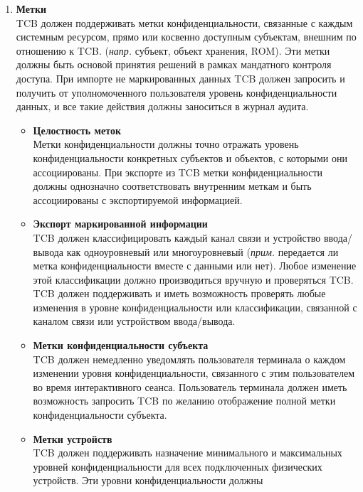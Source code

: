 \begin{enumerate}
\begin{enumerate}
\begin{enumerate}
\begin{enumerate}
                другому субъекту, получившему доступ к объекту хранения, ранее возвращенный системе.
                \item{\textbf{Метки}}\\
                TCB должен поддерживать метки конфиденциальности, связанные с каждым системным ресурсом, прямо или косвенно доступным субъектам, внешним по отношению к TCB. (\textit{напр.} субъект,
                объект хранения, ROM). Эти метки должны быть основой принятия решений в рамках мандатного контроля доступа. При импорте не маркированных данных TCB должен запросить и получить от
                уполномоченного пользователя уровень конфиденциальности данных, и все такие действия должны заноситься в журнал аудита.
                \begin{itemize}
                    \item{\textbf{Целостность меток}}\\
                    Метки конфиденциальности должны точно отражать уровень конфиденциальности конкретных субъектов и объектов, с которыми они ассоциированы. При экспорте из TCB метки конфиденциальности
                    должны однозначно соответствовать внутренним меткам и быть ассоциированы с экспортируемой информацией.
                    \item{\textbf{Экспорт маркированной информации}}\\
                    TCB должен классифицировать каждый канал связи и устройство ввода/вывода как одноуровневый или многоуровневый (\textit{прим. } передается ли метка конфиденциальности вместе с данными
                    или нет). Любое изменение этой классификации должно производиться вручную и проверяться TCB. TCB должен поддерживать и иметь возможность проверять любые изменения в уровне
                    конфиденциальности или классификации, связанной с каналом связи или устройством ввода/вывода.
                    \item{\textbf{Метки конфиденциальности субъекта}}\\
                    TCB должен немедленно уведомлять пользователя терминала о каждом изменении уровня конфиденциальности, связанного с этим пользователем во время интерактивного сеанса. Пользователь
                    терминала должен иметь возможность запросить TCB по желанию отображение полной метки конфиденциальности субъекта.
                    \item{\textbf{Метки устройств}}\\
                    TCB должен поддерживать назначение минимального и максимальных уровней конфиденциальности для всех подключенных физических устройств. Эти уровни конфиденциальности должны

\end{itemize}
\end{enumerate}
\end{enumerate}
\end{enumerate}
\end{enumerate}
